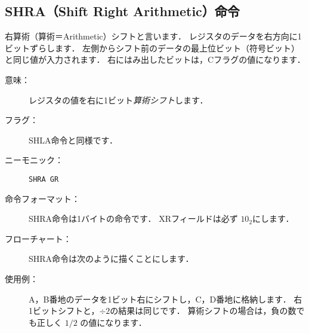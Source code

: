 \subsection{SHRA（Shift Right Arithmetic）命令}
右算術（算術＝Arithmetic）シフトと言います．
レジスタのデータを右方向に1ビットずらします．
左側からシフト前のデータの最上位ビット（符号ビット）と同じ値が入力されます．
右にはみ出したビットは，Cフラグの値になります．

\begin{center}
\end{center}

\begin{description}
\item[意味：]レジスタの値を右に1ビット\emph{算術シフト}します．

\item[フラグ：]
  SHLA命令と同様です．

\item[ニーモニック：]\texttt{SHRA  GR}

\item[命令フォーマット：]SHRA命令は1バイトの命令です．
  XRフィールドは必ず $10_2$にします．


\item[フローチャート：]SHRA命令は次のように描くことにします．

  \begin{center}
  \end{center}

\item[使用例：]
  A，B番地のデータを1ビット右にシフトし，C，D番地に格納します．
  右1ビットシフトと，$\div 2$の結果は同じです．
  算術シフトの場合は，負の数でも正しく $1/2$ の値になります．


\end{description}
